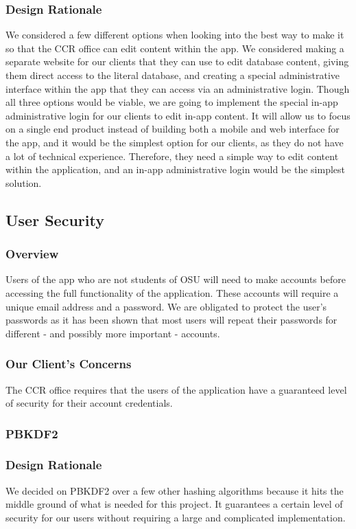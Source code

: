 \documentclass[draftclsnofoot, onecolumn, 10pt, compsoc]{IEEEtran}
\begin{document}
			\subsubsection{Design Rationale}
				We considered a few different options when looking into the best way to make it so that the CCR office can edit content within the app. We considered making a separate website for our clients that they can use to edit database content, giving them direct access to the literal database, and creating a special administrative interface within the app that they can access via an administrative login. Though all three options would be viable, we are going to implement the special in-app administrative login for our clients to edit in-app content. It will allow us to focus on a single end product instead of building both a mobile and web interface for the app, and it would be the simplest option for our clients, as they do not have a lot of technical experience. Therefore, they need a simple way to edit content within the application, and an in-app administrative login would be the simplest solution.

		\subsection{User Security}
			\subsubsection{Overview}
				Users of the app who are not students of OSU will need to make accounts before accessing the full functionality of the application. These accounts will require a unique email address and a password. We are obligated to protect the user's passwords as it has been shown that most users will repeat their passwords for different - and possibly more important - accounts.
			\subsubsection{Our Client's Concerns}
				The CCR office requires that the users of the application have a guaranteed level of security for their account credentials.
			\subsubsection{PBKDF2}
			\subsubsection{Design Rationale}
				We decided on PBKDF2 over a few other hashing algorithms because it hits the middle ground of what is needed for this project. It guarantees a certain level of security for our users without requiring a large and complicated implementation. 
				
\end{document}
